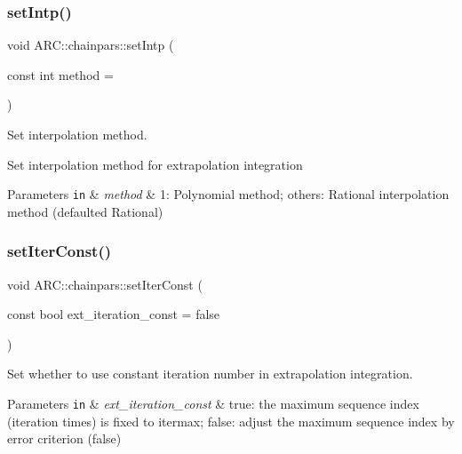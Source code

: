 \subsubsection{\texorpdfstring{set\+Intp()}{setIntp()}}
{\footnotesize\ttfamily void A\+R\+C\+::chainpars\+::set\+Intp (\begin{DoxyParamCaption}\item[{const int}]{method = {} }\end{DoxyParamCaption})\hspace{0.3cm}{\ttfamily [inline]}}



Set interpolation method. 

Set interpolation method for extrapolation integration 
\begin{DoxyParams}[1]{Parameters}
\mbox{\tt in}  & {\em method} & 1\+: Polynomial method; others\+: Rational interpolation method (defaulted Rational) \\
\hline
\end{DoxyParams}
\hypertarget{classARC_1_1chainpars_acee4adb70778441325e76eedbdbe6343}{}\label{classARC_1_1chainpars_acee4adb70778441325e76eedbdbe6343} 
\subsubsection{\texorpdfstring{set\+Iter\+Const()}{setIterConst()}}
{\footnotesize\ttfamily void A\+R\+C\+::chainpars\+::set\+Iter\+Const (\begin{DoxyParamCaption}\item[{const bool}]{ext\+\_\+iteration\+\_\+const = {\ttfamily false} }\end{DoxyParamCaption})\hspace{0.3cm}{\ttfamily [inline]}}



Set whether to use constant iteration number in extrapolation integration. 


\begin{DoxyParams}[1]{Parameters}
\mbox{\tt in}  & {\em ext\+\_\+iteration\+\_\+const} & true\+: the maximum sequence index (iteration times) is fixed to itermax; false\+: adjust the maximum sequence index by error criterion (false) \\
\hline
\end{DoxyParams}
\hypertarget{classARC_1_1chainpars_a58bf0df2cd23671e3e4651e9fe87ddae}{}\label{classARC_1_1chainpars_a58bf0df2cd23671e3e4651e9fe87ddae} 

